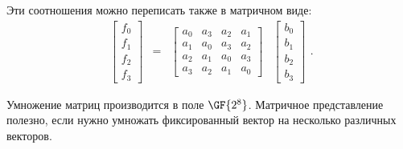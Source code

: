 Эти соотношения можно переписать также в матричном виде:
\[
    \begin{array}{cccc}
        \left[ \begin{array}{c}
            f_{0} \\
            f_{1} \\
            f_{2} \\
            f_{3}
        \end{array} \right] &  = & \left[\begin{array}{cccc}
            a_{0} & a_{3} & a_{2} & a_{1} \\
            a_{1} & a_{0} & a_{3} & a_{2} \\
            a_{2} & a_{1} & a_{0} & a_{3} \\
            a_{3} & a_{2} & a_{1} & a_{0}
        \end{array}\right] & \left[\begin{array}{c}
            b_{0} \\
            b_{1} \\
            b_{2} \\
            b_{3}
        \end{array} \right]
    \end{array}.
\]

Умножение матриц производится в поле $\GF{2^8}$. Матричное представление полезно, если нужно умножать фиксированный вектор на несколько различных векторов.

